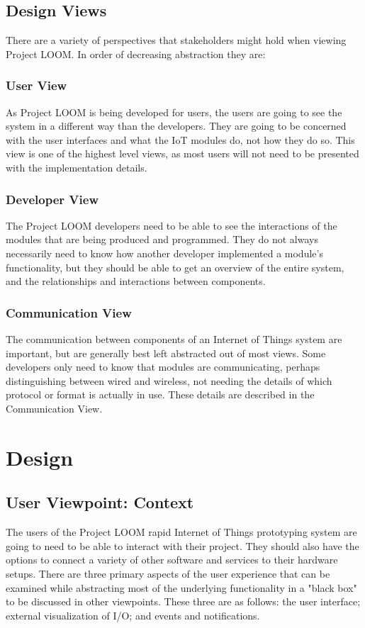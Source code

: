 \documentclass[onecolumn, draftclsnofoot,10pt, compsoc]{IEEEtran}
\begin{document}
\subsection{Design Views}
There are a variety of perspectives that stakeholders might hold when viewing Project LOOM. In order of decreasing abstraction they are:

\subsubsection{User View}
As Project LOOM is being developed for users, the users are going to see the system in a different way than the developers. They are going to be concerned with the user interfaces and what the IoT modules do, not how they do so. This view is one of the highest level views, as most users will not need to be presented with the implementation details.

\subsubsection{Developer View}
The Project LOOM developers need to be able to see the interactions of the modules that are being produced and programmed. They do not always necessarily need to know how another developer implemented a module's functionality, but they should be able to get an overview of the entire system, and the relationships and interactions between components.

\subsubsection{Communication View}
The communication between components of an Internet of Things system are important, but are generally best left abstracted out of most views. Some developers only need to know that modules are communicating, perhaps distinguishing between wired and wireless, not needing the details of which protocol or format is actually in use. These details are described in the Communication View.





\section{Design}
\subsection{User Viewpoint: Context}
The users of the Project LOOM rapid Internet of Things prototyping system are going to need to be able to interact with their project. They should also have the options to connect a variety of other software and services to their hardware setups. There are three primary aspects of the user experience that can be examined while abstracting most of the underlying functionality in a "black box" to be discussed in other viewpoints. These three are as follows: the user interface; external visualization of I/O; and events and notifications.
\end{document}
